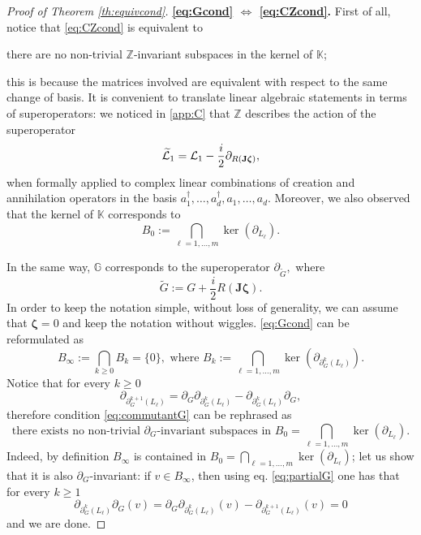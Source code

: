 \documentclass[preprint]{elsarticle}
\theoremstyle{definition}
\begin{document}
\begin{proof}[Proof of Theorem \ref{th:equivcond}]
\textbf{\eqref{eq:Gcond} $\Leftrightarrow$ \eqref{eq:CZcond}.} First of all, notice that \eqref{eq:CZcond} is equivalent to
\begin{center}
    there are no non-trivial $\mathbb{Z}$-invariant subspaces in the kernel of $\mathbb{K}$;
\end{center}
this is because the matrices involved are equivalent with respect to the same change of basis. It is convenient to translate linear algebraic statements in terms of superoperators: we noticed in \ref{app:C} that $\mathbb{Z}$ describes the action of the superoperator
$$\widetilde{{\cal L}}_1={\cal L}_1-\frac{i}{2}\partial_{R(\mathbf{J}\boldsymbol{\zeta})},$$
when formally applied to complex linear combinations of creation and annihilation operators in the basis $a^\dagger_1,\dots, a^\dagger_d, a_1, \dots, a_d$. Moreover, we also observed that the kernel of $\mathbb{K}$ corresponds to
$$B_0:=\bigcap_{\ell=1, \dots, m}\ker(\partial_{L_\ell}).$$

In the same way, $\mathbb{G}$ corresponds to the superoperator $\partial_{\widetilde{G}},$ where
$$\widetilde{G}:=G+\frac{i}{2}R(\mathbf{J}\boldsymbol{\zeta}).
$$
In order to keep the notation simple, without loss of generality, we can assume that $\boldsymbol{\zeta}=0$ and keep the notation without wiggles. \eqref{eq:Gcond} can be reformulated as
    \begin{equation} \label{eq:commutantG}
    B_\infty:=\bigcap_{k \geq 0}B_k=\{0\}, \text{ where } B_k:=\bigcap_{\ell=1,\dots, m}\ker(\partial_{\partial^k_G(L_\ell)}).\end{equation}
Notice that for every $k\geq 0$
\begin{equation} \label{eq:partialG}
\partial_{\partial^{k+1}_G(L_\ell)}=\partial_G\partial_{\partial^k_G(L_\ell)}-\partial_{\partial^k_G(L_\ell)}\partial_G,
\end{equation}
therefore condition \eqref{eq:commutantG} can be rephrased as
\begin{equation} \label{cond:Ginvariance}
    \text{there exists no non-trivial $\partial_G$-invariant subspaces in }B_0=\bigcap_{\ell=1, \dots, m}\ker(\partial_{L_\ell}).
\end{equation}
Indeed, by definition $B_\infty$ is contained in $B_0=\bigcap_{\ell=1, \dots, m}\ker(\partial_{L_\ell})$; let us show that it is also $\partial_G$-invariant: if $v \in B_\infty$, then using eq. \eqref{eq:partialG} one has that for every $k \geq 1$
$$\partial_{\partial^k_G(L_\ell)}\partial_G(v)=\partial_G\partial_{\partial^k_G(L_\ell)}(v)-\partial_{\partial^{k+1}_G(L_\ell)}(v)=0$$
and we are done.


\end{proof}
\end{document}
